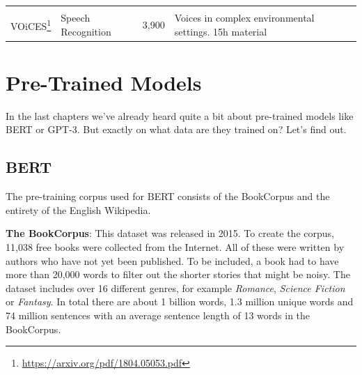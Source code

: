 \documentclass[]{krantz}
\renewcommand{\href}[2]{#2\footnote{\url{#1}}}
\begin{document}
\begin{longtable}[]{@{}llll@{}}
\begin{minipage}[t]{0.24\columnwidth}
\strut
\end{minipage} & \begin{minipage}[t]{0.10\columnwidth}\raggedright
\strut
\end{minipage} & \begin{minipage}[t]{0.23\columnwidth}\raggedright
\strut
\end{minipage}\tabularnewline
\begin{minipage}[t]{0.31\columnwidth}\raggedright
\href{https://arxiv.org/pdf/1804.05053.pdf}{VOiCES}\strut
\end{minipage} & \begin{minipage}[t]{0.24\columnwidth}\raggedright
Speech Recognition\strut
\end{minipage} & \begin{minipage}[t]{0.10\columnwidth}\raggedright
3,900\strut
\end{minipage} & \begin{minipage}[t]{0.23\columnwidth}\raggedright
Voices in complex environmental settings. 15h material\strut
\end{minipage}\tabularnewline
\bottomrule
\end{longtable}

\hypertarget{pre-trained-models}{%
\section{Pre-Trained Models}\label{pre-trained-models}}

In the last chapters we've already heard quite a bit about pre-trained models like BERT or GPT-3. But exactly on what data are they trained on? Let's find out.

\hypertarget{bert}{%
\subsection{BERT}\label{bert}}

The pre-training corpus used for BERT consists of the BookCorpus and the entirety of the English Wikipedia.

\textbf{The BookCorpus}: This dataset was released in 2015. To create the corpus, 11,038 free books were collected from the Internet. All of these were written by authors who have not yet been published. To be included, a book had to have more than 20,000 words to filter out the shorter stories that might be noisy. The dataset includes over 16 different genres, for example \emph{Romance}, \emph{Science Fiction} or \emph{Fantasy}. In total there are about 1 billion words, 1.3 million unique words and 74 million sentences with an average sentence length of 13 words in the BookCorpus. \citep{bookCorpus}
\end{document}
